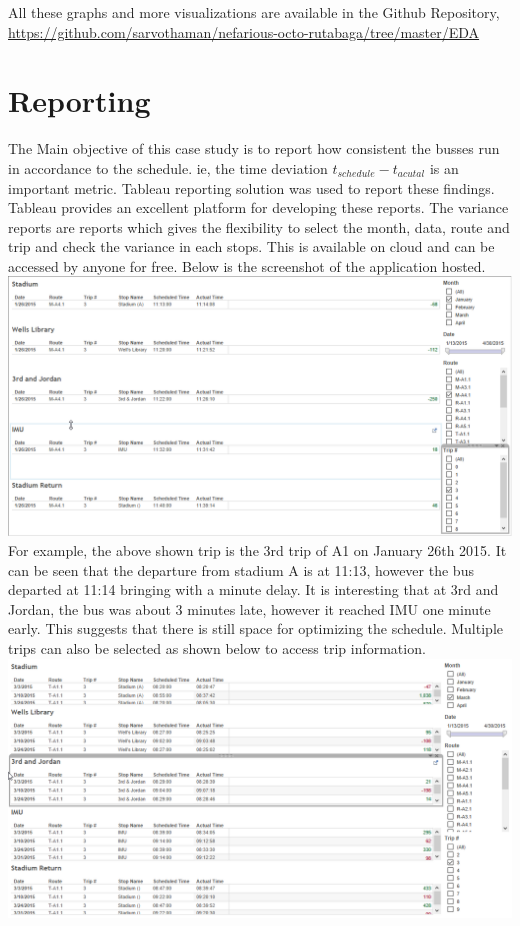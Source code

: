 \documentclass[12pt]{article}\usepackage[]{graphicx}\usepackage[]{color}
\begin{document}
All these graphs and more visualizations are available in the Github Repository, \url{https://github.com/sarvothaman/nefarious-octo-rutabaga/tree/master/EDA}
\section{Reporting}
The Main objective of this case study is to report how consistent the busses run in accordance to the schedule. ie, the time deviation $t_{schedule}-t_{acutal}$ is an important metric. Tableau reporting solution was used to report these findings. \\
Tableau provides an excellent platform for developing these reports. The variance reports are reports which gives the flexibility to select the month, data, route and trip and check the variance in each stops. This is available on cloud and can be accessed by anyone for free. Below is the screenshot of the application hosted.\\
\includegraphics[scale=0.4]{resources/tableau4}\\[1cm] 
For example, the above shown trip is the 3rd trip of A1 on January 26th 2015. It can be seen that the departure from stadium A is at 11:13, however the bus departed at 11:14 bringing with a minute delay. It is interesting that at 3rd and Jordan, the bus was about 3 minutes late, however it reached IMU one minute early. This suggests that there is still space for optimizing the schedule. Multiple trips can also be selected as shown below to access trip information.
\includegraphics[scale=0.4]{resources/tableau5}\\[1cm] 
\end{document}
